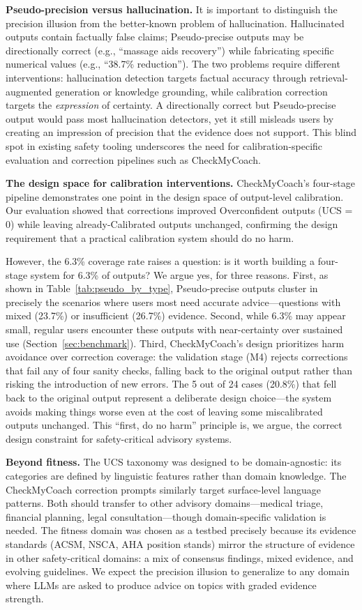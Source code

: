 \documentclass[manuscript, review, anonymous]{acmart}
\begin{document}
\textbf{Pseudo-precision versus hallucination.} It is important to distinguish the precision illusion from the better-known problem of hallucination. Hallucinated outputs contain factually false claims; Pseudo-precise outputs may be directionally correct (e.g., ``massage aids recovery'') while fabricating specific numerical values (e.g., ``38.7\% reduction''). The two problems require different interventions: hallucination detection targets factual accuracy through retrieval-augmented generation or knowledge grounding, while calibration correction targets the \emph{expression} of certainty. A directionally correct but Pseudo-precise output would pass most hallucination detectors, yet it still misleads users by creating an impression of precision that the evidence does not support. This blind spot in existing safety tooling underscores the need for calibration-specific evaluation and correction pipelines such as CheckMyCoach.

\textbf{The design space for calibration interventions.} CheckMyCoach's four-stage pipeline demonstrates one point in the design space of output-level calibration. Our evaluation showed that corrections improved Overconfident outputs (UCS = 0) while leaving already-Calibrated outputs unchanged, confirming the design requirement that a practical calibration system should do no harm.

However, the 6.3\% coverage rate raises a question: is it worth building a four-stage system for 6.3\% of outputs? We argue yes, for three reasons. First, as shown in Table~\ref{tab:pseudo_by_type}, Pseudo-precise outputs cluster in precisely the scenarios where users most need accurate advice---questions with mixed (23.7\%) or insufficient (26.7\%) evidence. Second, while 6.3\% may appear small, regular users encounter these outputs with near-certainty over sustained use (Section~\ref{sec:benchmark}). Third, CheckMyCoach's design prioritizes harm avoidance over correction coverage: the validation stage (M4) rejects corrections that fail any of four sanity checks, falling back to the original output rather than risking the introduction of new errors. The 5 out of 24 cases (20.8\%) that fell back to the original output represent a deliberate design choice---the system avoids making things worse even at the cost of leaving some miscalibrated outputs unchanged. This ``first, do no harm'' principle is, we argue, the correct design constraint for safety-critical advisory systems.

\textbf{Beyond fitness.} The UCS taxonomy was designed to be domain-agnostic: its categories are defined by linguistic features rather than domain knowledge. The CheckMyCoach correction prompts similarly target surface-level language patterns. Both should transfer to other advisory domains---medical triage, financial planning, legal consultation---though domain-specific validation is needed. The fitness domain was chosen as a testbed precisely because its evidence standards (ACSM, NSCA, AHA position stands) mirror the structure of evidence in other safety-critical domains: a mix of consensus findings, mixed evidence, and evolving guidelines. We expect the precision illusion to generalize to any domain where LLMs are asked to produce advice on topics with graded evidence strength.
\end{document}
